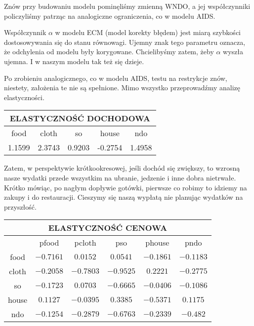 \documentclass[11pt,a4paper]{report}
\begin{document}
Znów przy budowaniu modelu pominęliśmy zmienną WNDO, a jej współczynniki policzyliśmy patrząc na analogiczne ograniczenia, co w modelu AIDS. 

\bigskip

Współczynnik $\alpha$ w modelu ECM (model korekty błędem) jest miarą szybkości dostosowywania się do stanu równowagi. Ujemny znak tego parametru oznacza, że odchylenia od modelu były korygowane. Chcielibyśmy zatem, żeby $\alpha$ wyszła ujemna. I w naszym modelu tak też się dzieje.

\bigskip

Po zrobieniu analogicznego, co w modelu AIDS, testu na restrykcje znów, niestety, założenia te nie są spełnione. Mimo wszystko przeprowadźmy analizę elastyczności.

\bigskip

\begin{center}
\begin{tabular}{|c|c|c|c|c|}
\hline
\multicolumn{5}{|c|}{ELASTYCZNOŚĆ DOCHODOWA}  \\ \hline 
food  & cloth  & so  & house  & ndo  \\ \hline
1.1599  & 2.3743  & 0.9203  & -0.2754  & 1.4958 \\ \hline
\end{tabular}
\end{center}

Zatem, w perspektywie krótkookresowej, jeśli dochód się zwiększy, to wzrosną nasze wydatki przede wszystkim na ubranie, jedzenie i inne dobra nietrwałe. Krótko mówiąc, po nagłym dopływie gotówki, pierwsze co robimy to idziemy na zakupy i do restauracji. Cieszymy się naszą wypłatą nie planując wydatków na przyszłość.

\begin{center}
\begin{tabular}{|c|c|c|c|c|c|}
\hline
\multicolumn{6}{|c|}{ELASTYCZNOŚĆ CENOWA}  \\ \hline 
& pfood  & pcloth  & pso  & phouse  & pndo  \\  \hline
food  & $ -0.7161 $ & $ 0.0152 $ & $ 0.0541 $ & $ -0.1861 $ & $ -0.1183 $ \\  \hline 
cloth  & $ -0.2058 $ & $ -0.7803 $ & $ -0.9525 $ & $ 0.2221 $ & $ -0.2775 $ \\  \hline 
so  & $ -0.1723 $ & $ 0.0703 $ & $ -0.6665 $ & $ -0.0406 $ & $ -0.1086 $ \\  \hline 
house  & $ 0.1127 $ & $ -0.0395 $ & $ 0.3385 $ & $ -0.5371 $ & $ 0.1175 $ \\  \hline 
ndo  & $ -0.1254 $ & $ -0.2879 $ & $ -0.6763 $ & $ -0.2339 $ & $ -0.482 $ \\  \hline
\end{tabular}
\end{center}
\end{document}
